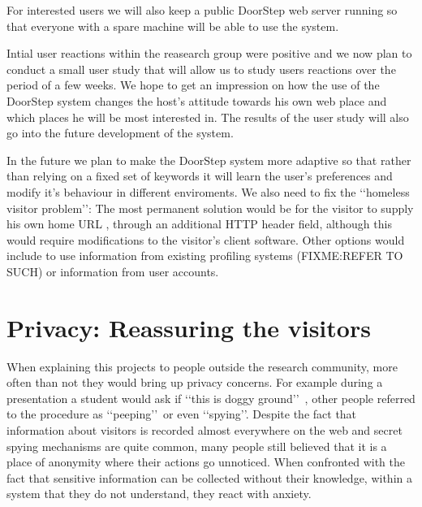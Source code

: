 \documentclass[a4paper]{danarticle}
\theoremstyle{remark}
\begin{document}
    For interested users we will also keep a public DoorStep web server running
    so that everyone with a spare machine will be able to use the system.
    
    Intial user reactions within the reasearch group were positive and we now
    plan to conduct a small user study that will allow us to study users
    reactions over the period of a few weeks. We hope to get an impression on how
    the use of the DoorStep system changes the host's attitude towards his own
    web place and which places he will be most interested in. The results of the
    user study will also go into the future development of the system.
    
    In the future we plan to make the DoorStep system more adaptive so that
    rather than relying on a fixed set of keywords it will learn the user's
    preferences and modify it's behaviour in different enviroments. We also need
    to fix the \lq\lq homeless visitor problem\rq\rq : The most permanent
    solution would be for the visitor to supply his own home URL \cite{webaware},
    through an additional HTTP header field, although this would require
    modifications to the visitor's client software. Other options would include
    to use information from existing profiling systems (FIXME:REFER TO SUCH) or
    information from user accounts.
  \section{Privacy: Reassuring the visitors}
    When explaining this projects to people outside the research community, more
    often than not they would bring up privacy concerns. For example during a
    presentation a student would ask if \lq\lq this is doggy ground\rq\rq\ ,
    other people referred to the procedure as \lq\lq peeping\rq\rq\ or even
    \lq\lq spying\rq\rq . Despite the fact that information about visitors is
    recorded almost everywhere on the web and secret spying mechanisms are
    quite common, many people still believed that it is a place of anonymity
    where their actions go unnoticed. When confronted with the fact
    that sensitive information can be collected without their knowledge, within a system that they do not
    understand, they react with anxiety.
    
\end{document}
